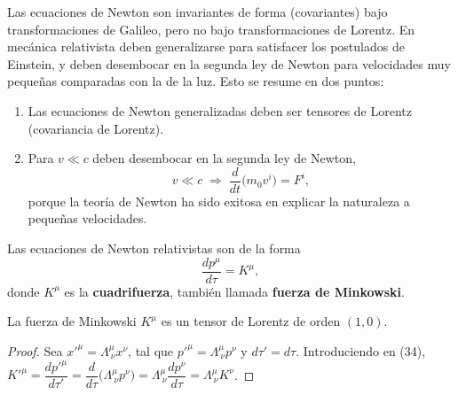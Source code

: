 Las ecuaciones de Newton son invariantes de forma (covariantes) bajo
transformaciones de Galileo, pero no bajo transformaciones de Lorentz.
En mecánica relativista deben generalizarse para satisfacer los
postulados de Einstein, y deben desembocar en la segunda ley de Newton
para velocidades muy pequeñas comparadas con la de la luz. Esto se
resume en dos puntos:
\begin{enumerate}
\item Las ecuaciones de Newton generalizadas deben ser tensores de
Lorentz (covariancia de Lorentz).
\item Para $v\ll c$ deben desembocar en la segunda ley de Newton,
\[
v\ll c \;\Longrightarrow\; \frac{d}{dt}\big(m_0v^i\big) = F^i, \tag{33}
\]
porque la teoría de Newton ha sido exitosa en explicar la naturaleza a
pequeñas velocidades.
\end{enumerate}

\begin{definicion}
Las ecuaciones de Newton relativistas son de la forma
\[
\frac{dp^\mu}{d\tau} = K^\mu, \tag{34}
\]
donde $K^\mu$ es la \textbf{cuadrifuerza}, también llamada \textbf{fuerza
de Minkowski}.
\end{definicion}

\begin{proposicionc}
La fuerza de Minkowski $K^\mu$ es un tensor de Lorentz de orden $(1,0)$.
\end{proposicionc}

\begin{proof}
Sea $x'^\mu=\Lambda^\mu_{\ \nu}x^\nu$, tal que $p'^\mu=\Lambda^\mu_{\
\nu}p^\nu$ y $d\tau'=d\tau$. Introduciendo en (34),
$K'^\mu=\dfrac{dp'^\mu}{d\tau'}=\dfrac{d}{d\tau}\big(\Lambda^\mu_{\
\nu}p^\nu\big)=\Lambda^\mu_{\ \nu}\dfrac{dp^\nu}{d\tau}=\Lambda^\mu_{\
\nu}K^\nu$. \qedhere
\end{proof}


